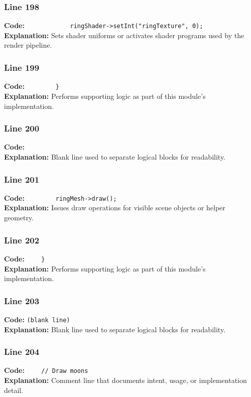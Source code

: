 \documentclass[11pt,a4paper]{article}
\begin{document}
\subsubsection*{Line 198}
\textbf{Code:} \verb|            ringShader->setInt("ringTexture", 0);|\\
\textbf{Explanation:} Sets shader uniforms or activates shader programs used by the render pipeline.

\subsubsection*{Line 199}
\textbf{Code:} \verb|        }|\\
\textbf{Explanation:} Performs supporting logic as part of this module's implementation.

\subsubsection*{Line 200}
\textbf{Code:} \verb|        |\\
\textbf{Explanation:} Blank line used to separate logical blocks for readability.

\subsubsection*{Line 201}
\textbf{Code:} \verb|        ringMesh->draw();|\\
\textbf{Explanation:} Issues draw operations for visible scene objects or helper geometry.

\subsubsection*{Line 202}
\textbf{Code:} \verb|    }|\\
\textbf{Explanation:} Performs supporting logic as part of this module's implementation.

\subsubsection*{Line 203}
\textbf{Code:} \texttt{(blank line)}\\
\textbf{Explanation:} Blank line used to separate logical blocks for readability.

\subsubsection*{Line 204}
\textbf{Code:} \verb|    // Draw moons|\\
\textbf{Explanation:} Comment line that documents intent, usage, or implementation detail.
\end{document}
